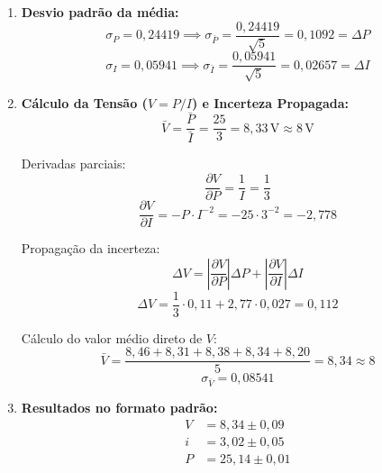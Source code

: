 \begin{enumerate}[label=\textbf{\arabic*)}, leftmargin=*]
\begin{enumerate}[label=\alph*)]
        \item \textbf{Desvio padrão da média:}
        \[
        \sigma_P = 0{,}24419 \implies \sigma_{\bar{P}} = \frac{0{,}24419}{\sqrt{5}} = 0{,}1092 = \Delta P
        \]
        \[
        \sigma_I = 0{,}05941 \implies \sigma_{\bar{I}} = \frac{0{,}05941}{\sqrt{5}} = 0{,}02657 = \Delta I
        \]

        \item \textbf{Cálculo da Tensão ($V = P / I$) e Incerteza Propagada:}
        \[
        \bar{V} = \frac{\bar{P}}{\bar{I}} = \frac{25}{3} = 8{,}33\,\text{V} \approx 8\,\text{V}
        \]
        
        Derivadas parciais:
        \[
        \frac{\partial V}{\partial P} = \frac{1}{I} = \frac{1}{3}
        \]
        \[
        \frac{\partial V}{\partial I} = -P \cdot I^{-2} = -25 \cdot 3^{-2} = -2{,}778
        \]

        Propagação da incerteza:
        \[
        \Delta V = \left| \frac{\partial V}{\partial P} \right| \Delta P + \left| \frac{\partial V}{\partial I} \right| \Delta I
        \]
        \[
        \Delta V = \frac{1}{3} \cdot 0{,}11 + 2{,}77 \cdot 0{,}027 = 0{,}112
        \]

        Cálculo do valor médio direto de $V$:
        \[
        \bar{V} = \frac{8{,}46 + 8{,}31 + 8{,}38 + 8{,}34 + 8{,}20}{5} = 8{,}34 \approx 8
        \]
        \[
        \sigma_{\bar{V}} = 0{,}08541
        \]

        \item \textbf{Resultados no formato padrão:}
        \begin{align*}
        V &= 8{,}34 \pm 0{,}09 \\
        i &= 3{,}02 \pm 0{,}05 \\
        P &= 25{,}14 \pm 0{,}01
        \end{align*}
    \end{enumerate}

\end{enumerate}
